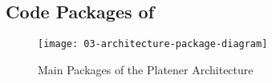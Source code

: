 \documentclass[../../ClassicThesis.tex]{subfiles}
\begin{document}




\subsection{Code Packages of {\platener}}
\label{sec:code-packages-platener}





\begin{figure}
  \centering
  \texttt{[image: 03-architecture-package-diagram]}
  \caption{Main Packages of the Platener Architecture}
  \label{fig:package-diagram}
\end{figure}
\end{document}
